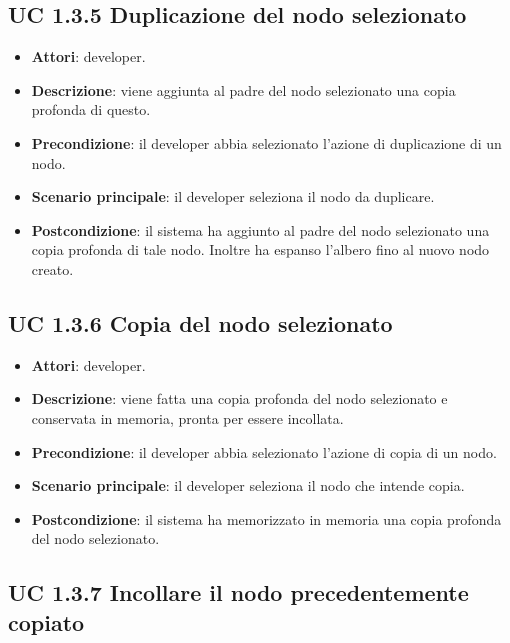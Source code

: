 	\subsection{UC 1.3.5 Duplicazione del nodo selezionato}
		\label{subsec:XEUC1.3.5}
		
		\begin{itemize}
			\item\textbf{Attori}: developer.
			\item\textbf{Descrizione}: viene aggiunta al padre del nodo selezionato una copia profonda di questo.
			\item\textbf{Precondizione}: il developer abbia selezionato l'azione di duplicazione di un nodo.
			\item\textbf{Scenario principale}: il developer seleziona il nodo da duplicare.
			\item\textbf{Postcondizione}: il sistema ha aggiunto al padre del nodo selezionato una copia profonda di tale nodo. Inoltre ha espanso l'albero fino al nuovo nodo creato.
		\end{itemize}
		
	\subsection{UC 1.3.6 Copia del nodo selezionato}
		\label{subsec:XEUC1.3.6}
		
		\begin{itemize}
			\item\textbf{Attori}: developer.
			\item\textbf{Descrizione}: viene fatta una copia profonda del nodo selezionato e conservata in memoria, pronta per essere incollata.
			\item\textbf{Precondizione}: il developer abbia selezionato l'azione di copia di un nodo.
			\item\textbf{Scenario principale}: il developer seleziona il nodo che intende copia.
			\item\textbf{Postcondizione}: il sistema ha memorizzato in memoria una copia profonda del nodo selezionato.
		\end{itemize}
		
	\subsection{UC 1.3.7 Incollare il nodo precedentemente copiato}
		\label{subsec:XEUC1.3.7}
		
